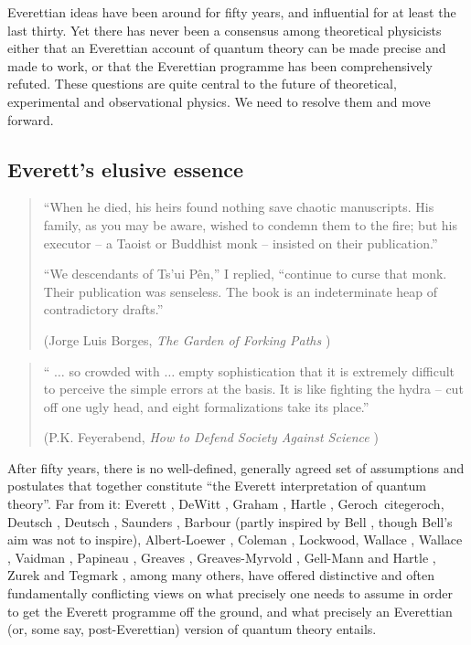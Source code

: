\documentclass[aps,
pra,epsfig,12pt]{revtex4}
\begin{document}
Everettian ideas have been around for fifty years, and influential for
at least the last thirty.  Yet there has never been a consensus among
theoretical physicists either that an Everettian account of quantum
theory can be made precise and made to work, or that the Everettian
programme has been comprehensively refuted.  These questions are quite
central to the future of theoretical, experimental and observational
physics.  We need to resolve them and move forward.

\subsection{Everett's elusive essence}

\begin{quotation}
``When he died, his heirs found nothing save chaotic manuscripts. His
family, as you may be aware, wished to condemn them to the fire; but 
his executor -- a Taoist or Buddhist monk --  insisted on their
publication.''

``We descendants of Ts'ui P\^{e}n,'' I  replied, ``continue to curse that
monk. Their publication was senseless. The book is an indeterminate
heap of contradictory drafts.''

(Jorge Luis Borges, {\it The Garden of Forking Paths} \cite{borges}) 
\end{quotation}

\begin{quotation}
`` $\ldots$ so crowded with $\ldots$ empty
sophistication that it is extremely difficult to
perceive the simple errors at the basis. It is like fighting the hydra --
cut off one ugly head, and eight formalizations take its place.'' 

(P.K. Feyerabend, {\it  How to Defend Society Against 
Science} \cite{feyerabend})
\end{quotation}

After fifty years, there is no well-defined, generally agreed set of
assumptions and postulates that together constitute ``the Everett
interpretation of quantum theory''.  Far from it: Everett \cite{everettone,everetttwo}, 
DeWitt \cite{dewitt}, Graham \cite{graham}, Hartle \cite{hartlefreq}, Geroch\ cite{geroch}, 
Deutsch \cite{deutschone}, Deutsch \cite{deutschtwo}, 
Saunders \cite{saundersvol}, Barbour \cite {barbour} (partly inspired
by Bell \cite{bellmw}, though Bell's aim was not to inspire), 
Albert-Loewer \cite{almanyminds}, Coleman \cite{coleman}, 
Lockwood\cite{lockwood}, Wallace \cite{wallacevolone}, 
Wallace \cite{wallacevoltwo}, Vaidman \cite{vaidman}, 
Papineau \cite{papineauvol}, Greaves \cite{greaves}, 
Greaves-Myrvold \cite{greavesmyrvoldvol},
Gell-Mann and Hartle \cite{hartlevol}, Zurek \cite{zurekvol} and
Tegmark \cite{tegmarkvol}, among many others, have offered
distinctive and often fundamentally conflicting views on what 
precisely one needs to assume in order to get the Everett programme off
the ground, and what precisely an Everettian (or, some say,
post-Everettian) version of quantum theory entails.  
\end{document}
